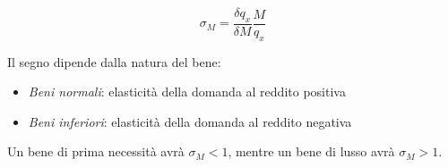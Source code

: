 \[
\sigma_{M} = \frac{\delta q_x}{\delta M} \frac{M}{q_x}
\]

Il segno dipende dalla natura del bene:
\begin{itemize}
	\item \emph{Beni normali}: elasticità della domanda al reddito positiva
	\item \emph{Beni inferiori}: elasticità della domanda al reddito negativa
\end{itemize}

Un bene di prima necessità avrà $\sigma_M < 1$, mentre un bene di lusso avrà $\sigma_M > 1$.